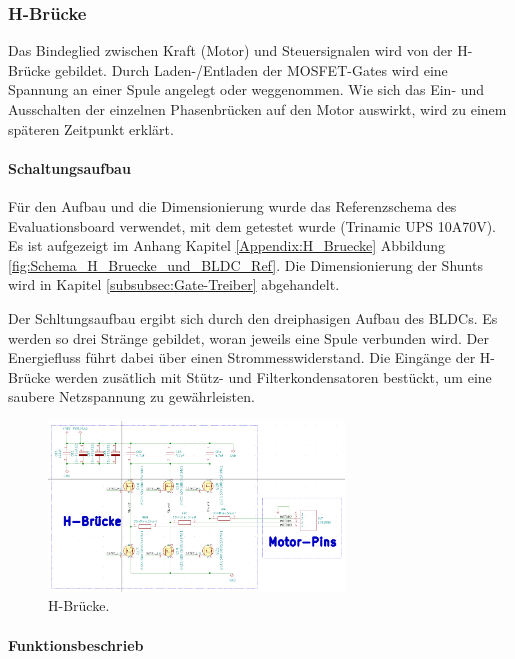 \subsubsection{H-Brücke}
\label{subsubsec:H-Brücke}

Das Bindeglied zwischen Kraft (Motor) und Steuersignalen wird von der H-Brücke gebildet. Durch Laden-/Entladen der MOSFET-Gates wird eine Spannung an einer Spule angelegt oder weggenommen. Wie sich das Ein- und Ausschalten der einzelnen Phasenbrücken auf den Motor auswirkt, wird zu einem späteren Zeitpunkt erklärt.

\paragraph{Schaltungsaufbau}\mbox{}

Für den Aufbau und die Dimensionierung wurde das Referenzschema des Evaluationsboard verwendet, mit dem getestet wurde (Trinamic UPS 10A70V). Es ist aufgezeigt im Anhang Kapitel \ref{Appendix:H_Bruecke} Abbildung \ref{fig:Schema_H_Bruecke_und_BLDC_Ref}. Die Dimensionierung der Shunts wird in Kapitel \ref{subsubsec:Gate-Treiber} abgehandelt.

Der Schltungsaufbau ergibt sich durch den dreiphasigen Aufbau des BLDCs. Es werden so drei Stränge gebildet, woran jeweils eine Spule verbunden wird. Der Energiefluss führt dabei über einen Strommesswiderstand. Die Eingänge der H-Brücke werden zusätlich mit Stütz- und Filterkondensatoren bestückt, um eine saubere Netzspannung zu gewährleisten.

\begin{figure}[h!]
	\centering
	\includegraphics[width=0.7\textwidth]{graphics/Schema_H_Bruecke_und_BLDC}
	\caption{H-Brücke.}
	\label{fig:Schema_H_Bruecke_und_BLDC}
\end{figure}

\paragraph{Funktionsbeschrieb}\mbox{}

